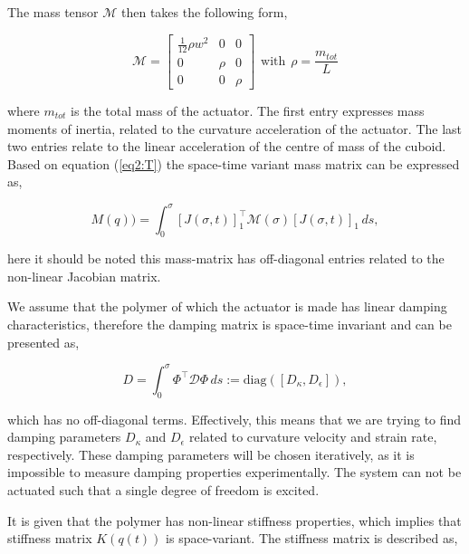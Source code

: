 The mass tensor $\mathcal{M}$ then takes the following form,

\begin{equation}
    \mathcal{M} = \begin{bmatrix} \frac{1}{12}\rho w^2 & 0 & 0 \\
                                   0 & \rho & 0 \\
                                   0 & 0 & \rho \end{bmatrix}\hspace{5pt} \text{with} \hspace{5pt} \rho = \frac{m_{tot}}{L}
\end{equation} 




where $m_{tot}$ is the total mass of the actuator. The first entry expresses mass moments of inertia, related to the curvature acceleration of the actuator. The last two entries relate to the linear acceleration of the centre of mass of the cuboid. Based on equation (\ref{eq2:T}) the space-time variant mass matrix can be expressed as, 


\begin{equation}
    M(q)) = \int_0^{\sigma} [J(\sigma,t)]_1^\top \mathcal{M}(\sigma)[J(\sigma,t)]_1  \hspace{2pt}ds,
\end{equation}

here it should be noted this mass-matrix has off-diagonal entries related to the non-linear Jacobian matrix. 

We assume that the polymer of which the actuator is made has linear damping characteristics, therefore the damping matrix is space-time invariant and can be presented as,

\begin{equation}
    D = \int_0^\sigma \Phi^\top \mathcal{D} \Phi \hspace{2pt} ds  := \text{diag}([D_\kappa, D_\epsilon]),
\end{equation}

which has no off-diagonal terms. Effectively, this means that we are trying to find damping parameters $D_\kappa$ and $D_\epsilon$ related to curvature velocity and strain rate, respectively. These damping parameters will be chosen iteratively, as it is impossible to measure damping properties experimentally. The system can not be actuated such that a single degree of freedom is excited. 

It is given that the polymer has non-linear stiffness properties, which implies that stiffness matrix $K(q(t))$ is space-variant. The stiffness matrix is described as,

